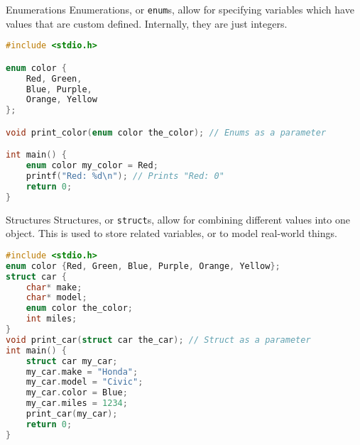 \documentclass[graphics]{beamer}
\begin{document}
\begin{frame}[fragile]{Enumerations}
    Enumerations, or \texttt{enum}s, allow for specifying variables which have values that are custom defined. Internally, they are just integers.
    \begin{lstlisting}[language=C,basicstyle=\footnotesize,keywordstyle=\color{blue},commentstyle=\color{green},showstringspaces=false,stringstyle=\color{red}]
#include <stdio.h>

enum color {
    Red, Green,
    Blue, Purple,
    Orange, Yellow
};

void print_color(enum color the_color); // Enums as a parameter

int main() {
    enum color my_color = Red;
    printf("Red: %d\n"); // Prints "Red: 0"
    return 0;
}
    \end{lstlisting}
\end{frame}

\begin{frame}[fragile]{Structures}
    Structures, or \texttt{struct}s, allow for combining different values into one object. This is used to store related variables, or to model real-world things.
    
    \begin{lstlisting}[language=C,basicstyle=\footnotesize,keywordstyle=\color{blue},commentstyle=\color{green},showstringspaces=false,stringstyle=\color{red}]
#include <stdio.h>
enum color {Red, Green, Blue, Purple, Orange, Yellow};
struct car {
    char* make;
    char* model;
    enum color the_color;
    int miles;
}
void print_car(struct car the_car); // Struct as a parameter
int main() {
    struct car my_car;
    my_car.make = "Honda";
    my_car.model = "Civic";
    my_car.color = Blue;
    my_car.miles = 1234;
    print_car(my_car);
    return 0;
}
    \end{lstlisting}
\end{frame}
\end{document}
